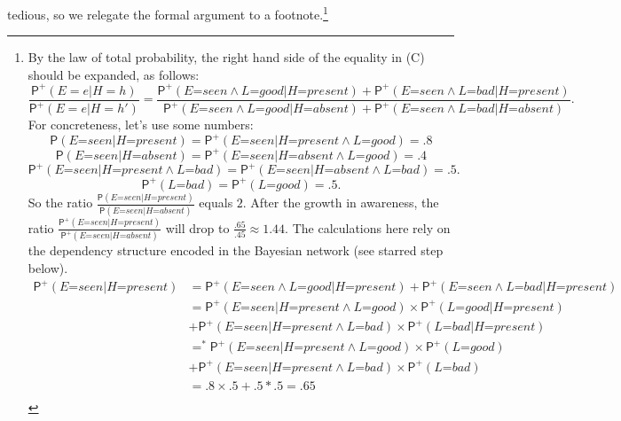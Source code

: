 \documentclass[
  11pt,
  dvipsnames,enabledeprecatedfontcommands, todos]{scrartcl}
\newcommand{\pr}[1]{\ensuremath{\mathsf{P}(#1)}}
\newcommand{\ppr}[2]{\ensuremath{\mathsf{P}^{#1}(#2)}}
\begin{document}
tedious, so we relegate the formal argument to a footnote.\footnote{By
  the law of total probability, the right hand side of the equality in
  (C) should be expanded, as follows:
  \[\frac{\ppr{+}{E=e \vert H=h}}{\ppr{+}{E=e \vert H=h'}}=\frac{\ppr{+}{\textit{E=seen} \wedge \textit{L=good} \vert \textit{H=present}}+\ppr{+}{\textit{E=seen} \wedge \textit{L=bad} \vert \textit{H=present}}}{\ppr{+}{\textit{E=seen} \wedge \textit{L=good} \vert \textit{H=absent}}+\ppr{+}{\textit{E=seen} \wedge \textit{L=bad} \vert \textit{H=absent}}}.\]
  For concreteness, let's use some numbers:
  \[\pr{\textit{E=seen} \vert \textit{H=present}}=\ppr{+}{\textit{E=seen} \vert \textit{H=present} \wedge \textit{L=good}}=.8\]
  \[\pr{\textit{E=seen} \vert \textit{H=absent}}=\ppr{+}{\textit{E=seen} \vert \textit{H=absent} \wedge \textit{L=good}}=.4\]
  \[\ppr{+}{\textit{E=seen} \vert \textit{H=present} \wedge \textit{L=bad}} = \ppr{+}{\textit{E=seen} \vert \textit{H=absent} \wedge \textit{L=bad}}=.5.\]
  \[\ppr{+}{\textit{L=bad}} = \ppr{+}{\textit{L=good}}=.5.\] So the
  ratio
  \(\frac{\pr{\textit{E=seen} \vert \textit{H=present}}}{\pr{\textit{E=seen} \vert \textit{H=absent}}}\)
  equals \(2\). After the growth in awareness, the ratio
  \(\frac{\ppr{+}{\textit{E=seen} \vert \textit{H=present}}}{\ppr{+}{\textit{E=seen} \vert \textit{H=absent}}}\)
  will drop to \(\frac{.65}{.45}\approx 1.44\). The calculations here
  rely on the dependency structure encoded in the Bayesian network (see
  starred step below). \begin{align*}
  \ppr{+}{\textit{E=seen} \vert \textit{H=present}} &= \ppr{+}{\textit{E=seen} \wedge \textit{L=good} \vert \textit{H=present}}+\ppr{+}{\textit{E=seen} \wedge \textit{L=bad} \vert \textit{H=present}}\\
  &= \ppr{+}{\textit{E=seen} \vert \textit{H=present} \wedge \textit{L=good}}  \times \ppr{+}{\textit{L=good} \vert  \textit{H=present} }\\ & +\ppr{+}{\textit{E=seen}  \vert \textit{H=present} \wedge \textit{L=bad}} \times \ppr{+}{\textit{L=bad} \vert  \textit{H=present}}\\
  &=^* \ppr{+}{\textit{E=seen} \vert \textit{H=present} \wedge \textit{L=good}}  \times \ppr{+}{\textit{L=good}}\\ & +\ppr{+}{\textit{E=seen}  \vert \textit{H=present} \wedge \textit{L=bad}} \times \ppr{+}{\textit{L=bad}}\\
  &= .8 \times .5 +.5 *.5 = .65 
  \end{align*} \begin{align*}

\end{align*}}
\end{document}
